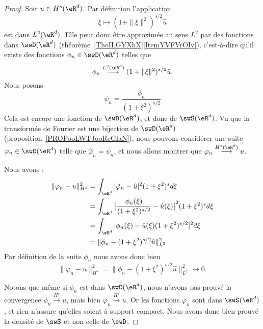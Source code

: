 \begin{proof}
	Soit \( u\in H^s(\eR^d)\). Par définition l'application
	\begin{equation}
		\xi\mapsto (1+\| \xi \|^2)^{s/2}\hat u
	\end{equation}
	est dans \( L^2(\eR^d)\). Elle peut donc être approximée au sens \( L^2\) par des fonctions dans \( \swD(\eR^d)\) (théorème~\ref{ThoILGYXhX}\ref{ItemYVFVrOIv}), c'est-à-dire qu'il existe des fonctions \( \phi_n\in\swD(\eR^d)\) telles que
	\begin{equation}
		\phi_n\stackrel{L^2(\eR^d)}{\longrightarrow}(1+\| \xi \|^2)^{s/2}\hat u.
	\end{equation}
	Nous posons
	\begin{equation}
		\psi_n=\frac{ \phi_n }{ (1+\xi^2)^{s/2} }
	\end{equation}
	Cela est encore une fonction de \( \swD(\eR^d)\), et donc de \( \swS(\eR^d)\). Vu que la transformée de Fourier est une bijection de \( \swD(\eR^d)\) (proposition~\ref{PROPooLWTJooReGlaN}), nous pouvons considérer une suite \( \varphi_n\in\swD(\eR^d)\) telle que \( \hat \varphi_n=\psi_n \), et nous allons montrer que \( \varphi_n\stackrel{H^s(\eR^d)}{\longrightarrow}u\).

	Nous avons :
	\begin{subequations}
		\begin{align}
			\| \varphi_n-u \|^2_{H^s} & =\int_{\eR^d}| \hat \varphi_n-\hat u |^2(1+\xi^2)^sd\xi                                       \\
			                          & =\int_{\eR^d}\big| \frac{ \phi_n(\xi) }{ (1+\xi^2)^{s/2} }-\hat u(\xi) \big|^2(1+\xi^2)^sd\xi \\
			                          & =\int_{\eR^d}| \phi_n(\xi)-\hat u(\xi)(1+\xi^2)^{s/2} |^2d\xi                                 \\
			                          & =\| \phi_n-(1+\xi^2)^{s/2}\hat u \|^2_{L^2}.
		\end{align}
	\end{subequations}
	Par définition de la suite \( \phi_n\) nous avons donc bien
	\begin{equation}
		\| \varphi_n-u \|^2_{H^s} =\| \phi_n-(1+\xi^2)^{s/2}\hat u \|^2_{L^2}\to 0.
	\end{equation}

	Notons que même si \( \phi_n\) est dans \( \swD(\eR^d)\), nous n'avons pas prouvé la convergence \( \phi_n\stackrel{H^s}{\longrightarrow}u\), mais bien \( \varphi_n\stackrel{H^s}{\longrightarrow}u\). Or les fonctions \( \varphi_n\) sont dans \( \swS(\eR^d)\), et rien n'assure qu'elles soient à support compact. Nous avons donc bien prouvé la densité de \( \swS\) et non celle de \( \swD\).
\end{proof}

